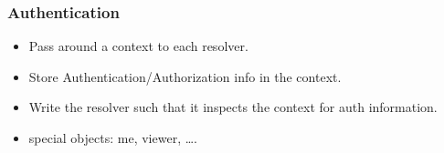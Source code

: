 \documentclass[lualatex]{beamer}
\begin{document}
\begin{frame}
  \frametitle{Authentication}
  \begin{itemize}
  \item Pass around a context to each resolver.
  \item Store Authentication/Authorization info in the context.
  \item Write the resolver such that it inspects the context for auth
    information.
  \item special objects: me, viewer, \ldots.
  \end{itemize}
\end{frame}
\end{document}
